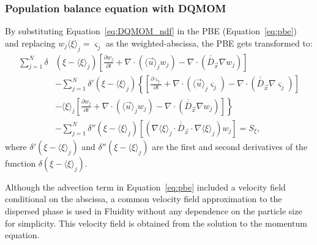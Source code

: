 \subsubsection{Population balance equation with DQMOM}
By substituting Equation~\eqref{eq:DQMOM_ndf} in the PBE (Equation~\eqref{eq:pbe}) and replacing $w_{j} \langle \xi \rangle_{j} = \varsigma_{j}$ as the weighted-abscissa, the PBE gets transformed to:
\begin{equation} \label{eq:dqmomdiff}
\begin{split}
\sum_{j=1}^N \delta&(\xi - \langle \xi \rangle_{j}) \left[ \frac{\partial w_{j}}{\partial t} + 
\nabla \cdot \left( \langle \vec{u} \rangle_j w_j \right) - 
\nabla \cdot \left( \overline{\overline{D}}_{\vec{x}} \nabla w_j \right)
 \right]\\
&- \sum_{j=1}^N \delta'(\xi - \langle \xi \rangle_{j}) \left\{ \left[ \frac{\partial \varsigma_{j}}{\partial t} + 
\nabla \cdot \left( \langle \vec{u} \rangle_j \varsigma_j \right)
 - 
 \nabla \cdot \left( \overline{\overline{D}}_{\vec{x}} \nabla \varsigma_j \right) \right]
  \right.\\
&- \left.\langle \xi \rangle_{j} \left[ \frac{\partial w_{j}}{\partial t} + 
\nabla \cdot \left( \langle \vec{u} \rangle_j w_j \right)
 - 
 \nabla \cdot \left( \overline{\overline{D}}_{\vec{x}} \nabla w_j \right)
  \right] \right\}\\
&- \sum_{j=1}^N \delta''(\xi - \langle \xi \rangle_{j}) \left[ \left( \nabla \langle \xi \rangle_j \cdot \overline{\overline{D}}_{\vec{x}} \cdot \nabla \langle \xi \rangle_j \right) w_j \right] = S_{\xi},
\end{split}
\end{equation}
where $\delta'(\xi - \langle \xi \rangle_{j})$ and $\delta''(\xi - \langle \xi \rangle_{j})$ are the first and second derivatives of the function $\delta(\xi - \langle \xi \rangle_{j})$.

Although the advection term in Equation~\eqref{eq:pbe} included a velocity field conditional on the abscissa, a common velocity field approximation to the dispersed phase is used in Fluidity without any dependence on the particle size for simplicity. This velocity field is obtained from the solution to the momentum equation.

